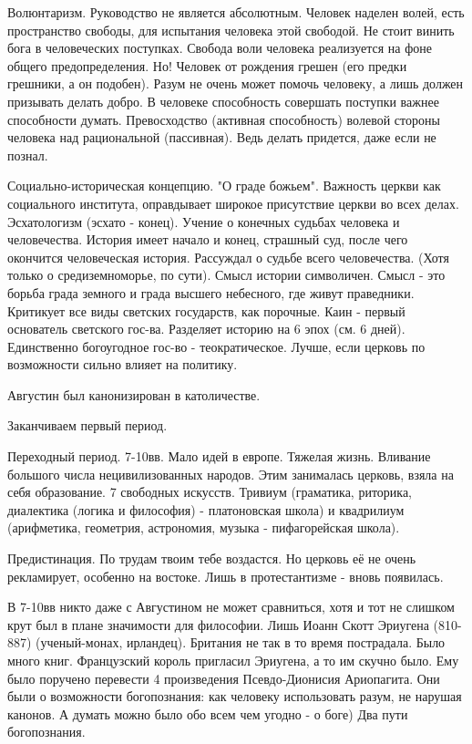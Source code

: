 Волюнтаризм. Руководство не является абсолютным. Человек наделен волей, есть пространство свободы, для испытания человека этой свободой. Не стоит винить бога в человеческих поступках. Свобода воли человека реализуется на фоне общего предопределения. Но! Человек от рождения грешен (его предки грешники, а он подобен). Разум не очень может помочь человеку, а лишь должен призывать делать добро. В человеке способность совершать поступки важнее способности думать. Превосходство (активная способность) волевой стороны человека над рациональной (пассивная). Ведь делать придется, даже если не познал.

Социально-историческая концепцию. "О граде божьем". Важность церкви как социального института, оправдывает широкое присутствие церкви во всех делах. Эсхатологизм (эсхато - конец). Учение о конечных судьбах человека и человечества. История имеет начало и конец, страшный суд, после чего окончится человеческая история. Рассуждал о судьбе всего человечества. (Хотя только о средиземноморье, по сути). Смысл истории символичен. Смысл - это борьба града земного и града высшего небесного, где живут праведники. Критикует все виды светских государств, как порочные. Каин - первый основатель светского гос-ва. Разделяет историю на 6 эпох (см. 6 дней). Единственно богоугодное гос-во - теократическое. Лучше, если церковь по возможности сильно влияет на политику.

Августин был канонизирован в католичестве.

Заканчиваем первый период.

Переходный период.
7-10вв.
Мало идей в европе. Тяжелая жизнь. Вливание большого числа нецивилизованных народов. Этим занималась церковь, взяла на себя образование. 7 свободных искусств. Тривиум (граматика, риторика, диалектика (логика и философия) - платоновская школа) и квадрилиум (арифметика, геометрия, астрономия, музыка - пифагорейская школа).

Предистинация. По трудам твоим тебе воздастся. Но церковь её не очень рекламирует, особенно на востоке. Лишь в протестантизме - вновь появилась.

В 7-10вв никто даже с Августином не может сравниться, хотя и тот не слишком крут был в плане значимости для философии.
Лишь Иоанн Скотт Эриугена (810-887) (ученый-монах, ирландец). Британия не так в то время пострадала. Было много книг. Французский король пригласил Эриугена, а то им скучно было. Ему было поручено перевести 4 произведения Псевдо-Дионисия Ариопагита. Они были о возможности богопознания: как человеку использовать разум, не нарушая канонов. А думать можно было обо всем чем угодно - о боге)
Два пути богопознания.

